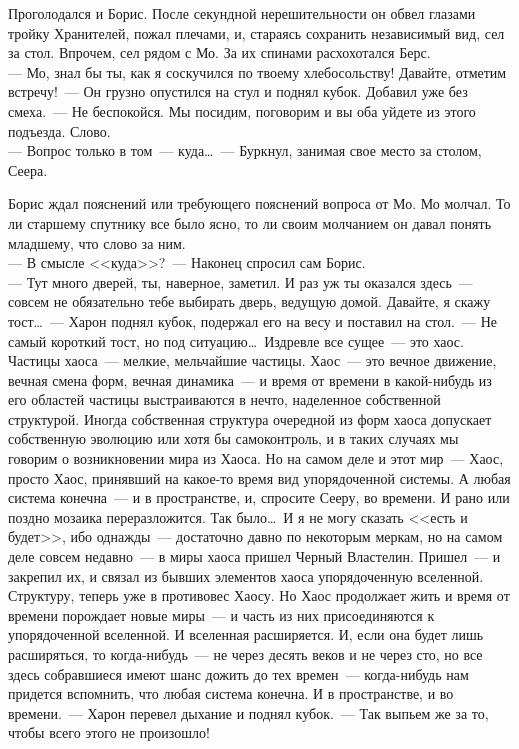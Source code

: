 Проголодался и Борис. После секундной нерешительности он обвел глазами тройку 
Хранителей, пожал плечами, и, стараясь сохранить независимый вид, сел за стол. 
Впрочем, сел рядом с Мо. За их спинами расхохотался Берс.\\
--- Мо, знал бы ты, как я соскучился по твоему хлебосольству! Давайте, отметим 
встречу!~--- Он грузно опустился на стул и поднял кубок. Добавил уже без 
смеха.~--- Не беспокойся. Мы посидим, поговорим и вы оба уйдете из этого подъезда. Слово.\\
--- Вопрос только в том~--- куда\ldots~--- Буркнул, занимая свое место за столом, 
Сеера.

Борис ждал пояснений или требующего пояснений вопроса от Мо. Мо молчал. То ли 
старшему спутнику все было ясно, то ли своим молчанием он давал понять 
младшему, что слово за ним.\\
--- В смысле <<куда>>?~--- Наконец спросил сам Борис.\\
--- Тут много дверей, ты, наверное, заметил. И раз уж ты оказался здесь~--- 
совсем не обязательно тебе выбирать дверь, ведущую домой. Давайте, я скажу 
тост\ldots~--- Харон поднял кубок, подержал его на весу и поставил на стол.~--- Не самый 
короткий тост, но под ситуацию\ldots\ Издревле все сущее~--- это хаос. Частицы хаоса~--- 
мелкие, мельчайшие частицы. Хаос~--- это вечное движение, вечная смена форм, вечная 
динамика~--- и время от времени в какой-нибудь из его областей частицы 
выстраиваются в нечто, наделенное собственной структурой. Иногда собственная 
структура очередной из форм хаоса допускает собственную эволюцию или хотя бы 
самоконтроль, и в таких случаях мы говорим о возникновении мира из Хаоса. Но на 
самом деле и этот мир~--- Хаос, просто Хаос, принявший на какое-то время вид 
упорядоченной системы. А любая система конечна~--- и в пространстве, и, 
спросите Сееру, во времени. И рано или поздно мозаика переразложится.
Так было\ldots\ И я не могу сказать <<есть и будет>>, ибо однажды~--- 
достаточно давно по некоторым меркам, но на самом деле совсем недавно~--- в миры хаоса пришел 
Черный Властелин. Пришел~--- и закрепил их, и связал из бывших элементов хаоса 
упорядоченную вселенной. Структуру, теперь уже в противовес Хаосу. Но Хаос 
продолжает жить и время от времени порождает новые миры~--- и часть из них 
присоединяются к упорядоченной вселенной. И вселенная расширяется. И, если она 
будет лишь расширяться, то когда-нибудь~--- не через десять веков и не через 
сто, но все здесь собравшиеся имеют шанс дожить до тех времен~--- когда-нибудь нам 
придется вспомнить, что любая система конечна. И в пространстве, и во времени.~--- 
Харон перевел дыхание и поднял кубок.~--- Так выпьем же за то, чтобы всего 
этого не произошло!

